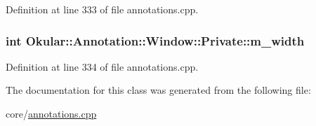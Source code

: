 Definition at line 333 of file annotations.\+cpp.

\hypertarget{classAnnotation_1_1Window_1_1Private_ad0a73e95d3ff2d3e702892c375a9efaa}{
\subsubsection[{m\+\_\+width}]{\setlength{\rightskip}{0pt plus 5cm}int Okular\+::\+Annotation\+::\+Window\+::\+Private\+::m\+\_\+width}}\label{classAnnotation_1_1Window_1_1Private_ad0a73e95d3ff2d3e702892c375a9efaa}


Definition at line 334 of file annotations.\+cpp.



The documentation for this class was generated from the following file\+:\begin{DoxyCompactItemize}
\item 
core/\hyperlink{annotations_8cpp}{annotations.\+cpp}\end{DoxyCompactItemize}
